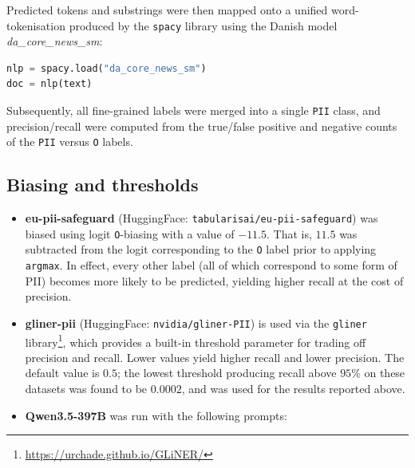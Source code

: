 \documentclass[11pt,a4paper]{article}
\begin{document}
Predicted tokens and substrings were then mapped onto a unified word-tokenisation produced by the \texttt{spacy} library using the Danish model \emph{da\_core\_news\_sm}:
\begin{lstlisting}[language=Python]
nlp = spacy.load("da_core_news_sm")
doc = nlp(text)
\end{lstlisting}
Subsequently, all fine-grained labels were merged into a single \texttt{PII} class, and precision/recall were computed from the true/false positive and negative counts of the \texttt{PII} versus \texttt{O} labels.

\subsection{Biasing and thresholds}

\begin{itemize}[leftmargin=*, itemsep=4pt]
  \item \textbf{eu-pii-safeguard} (HuggingFace: \texttt{tabularisai/eu-pii-safeguard}) was biased using logit \texttt{O}-biasing with a value of $-11.5$. That is, $11.5$ was subtracted from the logit corresponding to the \texttt{O} label prior to applying \texttt{argmax}. In effect, every other label (all of which correspond to some form of PII) becomes more likely to be predicted, yielding higher recall at the cost of precision.

  \item \textbf{gliner-pii} (HuggingFace: \texttt{nvidia/gliner-PII}) is used via the \texttt{gliner} library\footnote{\url{https://urchade.github.io/GLiNER/}}, which provides a built-in threshold parameter for trading off precision and recall. Lower values yield higher recall and lower precision. The default value is $0.5$; the lowest threshold producing recall above $95\%$ on these datasets was found to be $0.0002$, and was used for the results reported above.

  \item \textbf{Qwen3.5-397B} was run with the following prompts:
\end{itemize}
\end{document}
